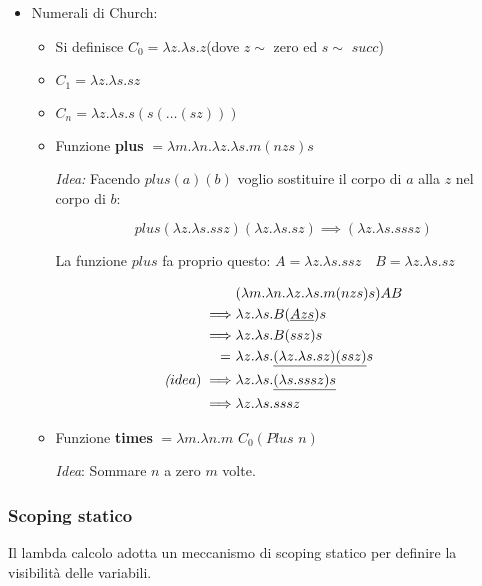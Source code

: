 \documentclass[a4paper,10pt]{article}
\begin{document}
 
 \begin{itemize}
  \item Numerali di Church:
  \begin{itemize}
   \item Si definisce $C_0 = \lambda z. \lambda s . z$\quad\quad (dove $z \sim$ zero ed $s \sim$ $succ$)
   \item $C_1 = \lambda z.\lambda s.sz$ 
   \item $C_n = \lambda z.\lambda s . s(s(\hdots (sz)))$
   \item Funzione \textbf{plus} $= \lambda m.\lambda n.\lambda z.\lambda s.m(n z s)s$\smallskip
   
   \textit{Idea:} Facendo $plus (a) (b)$ voglio sostituire il corpo di $a$ alla $z$ nel corpo di $b$:
   
   \[ plus (\lambda z .\lambda s. ssz) (\lambda z .\lambda s. sz) \implies (\lambda z .\lambda s. sssz)\]
  
  La funzione $plus$ fa proprio questo: \hfill $A = \lambda z.\lambda s. ssz \quad B = \lambda z.\lambda s. sz$ \hfill \,
  
  \[\begin{aligned}
     &(\lambda m.\lambda n.\lambda z.\lambda s.m(n z s)s) A B\\
     \implies &\lambda z.\lambda s.B(\underline{A z s})s\\
     \implies &\lambda z.\lambda s.B(ssz)s\\
     =\,\, &\lambda z.\lambda s.\underline{(\lambda z .\lambda s. sz)(ssz)}s\\
     \textit(idea) \implies &\lambda z.\lambda s. \underline{(\lambda s.sssz)s}\\
     \implies &\lambda z. \lambda s. sssz
    \end{aligned}
\]
  \item Funzione \textbf{times} $= \lambda m. \lambda n. m \,\,C_0 (Plus\,\, n)$
  
  \textit{Idea}: Sommare $n$ a zero $m$ volte.
  \end{itemize}
  
 \end{itemize}

 \newpage

 \subsubsection{Scoping statico}
 Il lambda calcolo adotta un meccanismo di scoping statico per definire la visibilità delle variabili. \smallskip
 
\end{document}
